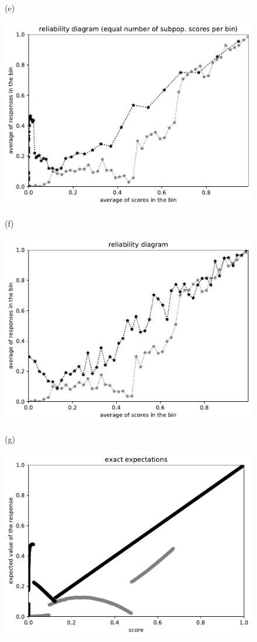 \documentclass{article}
\newlength{\vertsep}
\newlength{\imsize}
\begin{document}
\begin{figure}
\begin{centering}
(e)
\parbox{\imsize}{\includegraphics[width=\imsize]
{../codes/unweighted/10000_7000_50_1/equisamps.pdf}}
\quad\quad
(f)
\parbox{\imsize}{\includegraphics[width=\imsize]
{../codes/unweighted/10000_7000_50_1/equiscore.pdf}}

\vspace{\vertsep}

(g)
\parbox{\imsize}{\includegraphics[width=\imsize]
{../codes/unweighted/10000_7000_10_1/exact.pdf}}


\end{centering}
\end{figure}
\end{document}
